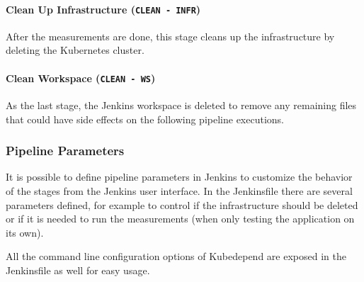 \paragraph{Clean Up Infrastructure (\texttt{CLEAN - INFR})} After the measurements are done, this stage cleans up the infrastructure by deleting the Kubernetes cluster.

\paragraph{Clean Workspace (\texttt{CLEAN - WS})} As the last stage, the Jenkins workspace is deleted to remove any remaining files that could have side effects on the following pipeline executions.

\subsubsection{Pipeline Parameters}

It is possible to define pipeline parameters in Jenkins to customize the behavior of the stages from the Jenkins user interface. In the Jenkinsfile there are several parameters defined, for example to control if the infrastructure should be deleted or if it is needed to run the measurements (\eg when only testing the application on its own).

All the command line configuration options of Kubedepend are exposed in the Jenkinsfile as well for easy usage.

